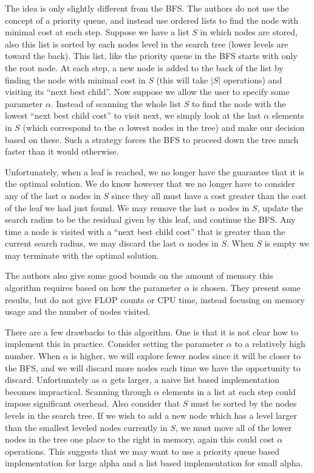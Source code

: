 \documentclass[12pt,Bold,letterpaper]{mcgilletdclass}
\begin{document}
The idea is only slightly different from the BFS. The authors do not use the concept of a priority queue, and instead use ordered lists to find the node with minimal cost at each step. Suppose we have a list $S$ in which nodes are stored, also this list is sorted by each nodes level in the search tree (lower levels are toward the back). This list, like the priority queue in the BFS starts with only the root node. At each step, a new node is added to the back of the list by finding the node with minimal cost in $S$ (this will take $|S|$ operations) and visiting its ``next best child''. Now suppose we allow the user to specify some parameter $\alpha$. Instead of scanning the whole list $S$ to find the node with the lowest ``next best child cost'' to visit next, we simply look at the last $\alpha$ elements in $S$ (which correspond to the $\alpha$ lowest nodes in the tree) and make our decision based on these. Such a strategy forces the BFS to proceed down the tree much faster than it would otherwise.

Unfortunately, when a leaf is reached, we no longer have the guarantee that it is the optimal solution. We do know however that we no longer have to consider any of the last $\alpha$ nodes in $S$ since they all must have a cost greater than the cost of the leaf we had just found. We may remove the last $\alpha$ nodes in $S$, update the search radius to be the residual given by this leaf, and continue the BFS. Any time a node is visited with a ``next best child cost'' that is greater than the current search radius, we may discard the last $\alpha$ nodes in $S$. When $S$ is empty we may terminate with the optimal solution.

The authors also give some good bounds on the amount of memory this algorithm requires based on how the parameter $\alpha$ is chosen. They present some results, but do not give FLOP counts or CPU time, instead focusing on memory usage and the number of nodes visited.

There are a few drawbacks to this algorithm. One is that it is not clear how to implement this in practice. Consider setting the parameter $\alpha$ to a relatively high number. When $\alpha$ is higher, we will explore fewer nodes since it will be closer to the BFS, and we will discard more nodes each time we have the opportunity to discard. Unfortunately as $\alpha$ gets larger, a naive list based implementation becomes impractical. Scanning through $\alpha$ elements in a list at each step could impose significant overhead. Also consider that $S$ must be sorted by the nodes levels in the search tree. If we wish to add a new node which has a level larger than the smallest leveled nodes currently in $S$, we must move all of the lower nodes in the tree one place to the right in memory, again this could cost $\alpha$ operations. This suggests that we may want to use a priority queue based implementation for large alpha and a list based implementation for small alpha. 
\end{document}
